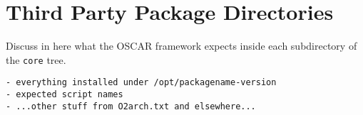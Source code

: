 %
%
%

\section{Third Party Package Directories}
\label{sec:third-directories}

Discuss in here what the OSCAR framework expects inside each
subdirectory of the {\tt core} tree.

\begin{verbatim}
- everything installed under /opt/packagename-version
- expected script names
- ...other stuff from O2arch.txt and elsewhere...
\end{verbatim}

